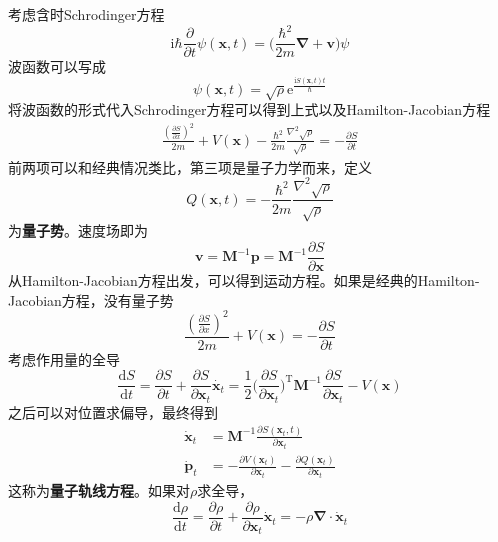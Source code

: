         考虑含时Schrodinger方程
        \begin{equation*}
            \mathrm{i}\hbar \frac {\partial}{\partial t} \psi(\bm{x},t) = \bigg(\frac {\hbar^2}{2m}\bm{\nabla + \bm{v}}\bigg)\psi
        \end{equation*}
        波函数可以写成
        \begin{equation*}
            \psi(\bm{x},t) = \sqrt{\rho} \mathrm{e}^{\frac {\mathrm{i}S(\bm{x},t)t}{\hbar}}
        \end{equation*}
        将波函数的形式代入Schrodinger方程可以得到上式以及Hamilton-Jacobian方程
        \begin{align*}
            \frac {(\frac {\partial S}{\partial x})^2}{2m} + V(\bm{x}) - \frac {\hbar^2}{2m} \frac {\nabla^2 \sqrt{\rho}}{\sqrt{\rho}} = -\frac {\partial S}{\partial t}
        \end{align*}
        前两项可以和经典情况类比，第三项是量子力学而来，定义
        \begin{equation*}
            Q(\bm{x},t) = - \frac {\hbar^2}{2m} \frac {\nabla^2 \sqrt{\rho}}{\sqrt{\rho}}
        \end{equation*}
        为\textbf{量子势}。速度场即为
        \begin{equation*}
            \bm{v} = \bm{M}^{-1}\bm{p} = \bm{M}^{-1}\frac {\partial S}{\partial \bm{x}}
        \end{equation*}
        从Hamilton-Jacobian方程出发，可以得到运动方程。如果是经典的Hamilton-Jacobian方程，没有量子势
        \begin{equation*}
            \frac {(\frac {\partial S}{\partial x})^2}{2m} + V(\bm{x}) = -\frac {\partial S}{\partial t}
        \end{equation*}
        考虑作用量的全导
        \begin{equation*}
            \frac {\mathrm{d}S}{\mathrm{d}t} = \frac {\partial S}{\partial t} + \frac {\partial S}{\partial \bm{x}_t} \dot{\bm{x}_t} = \frac 12 \bigg(\frac {\partial S}{\partial \bm{x}_t}\bigg)^{\mathrm{T}} \bm{M}^{-1} \frac {\partial S}{\partial \bm{x}_t} - V(\bm{x})
        \end{equation*}
        之后可以对位置求偏导，最终得到
        \begin{align*}
            \dot{\bm{x}}_t &= \bm{M}^{-1} \frac {\partial S(\bm{x}_t,t)}{\partial \bm{x}_t}\\
            \dot{\bm{p}}_t &= -\frac {\partial V(\bm{x}_t)}{\partial \bm{x}_t} - \frac {\partial Q(\bm{x}_t)}{\partial \bm{x}_t}
        \end{align*}
        这称为\textbf{量子轨线方程}。如果对$\rho$求全导，
        \begin{equation*}
            \frac {\mathrm{d}\rho}{\mathrm{d}t} = \frac {\partial \rho}{\partial t} + \frac {\partial \rho}{\partial \bm{x}_t} \dot{\bm{x}}_t = -\rho \bm{\nabla} \cdot \dot{\bm{x}}_t
        \end{equation*}

